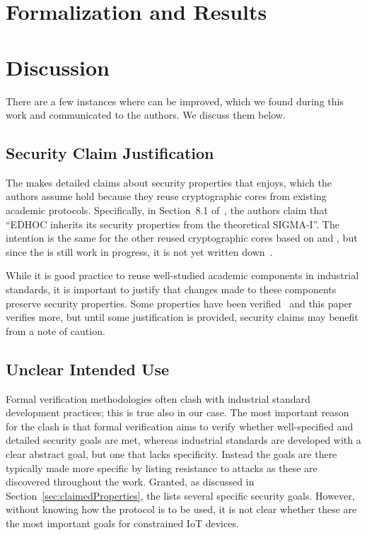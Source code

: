\documentclass[runningheads, envcountsame, hidelinks, a4paper, x11names]{article}
\begin{document}
\section{Formalization and Results}
\label{sec:formalization}


\section{Discussion}
\label{sec:discussion}
There are a few instances where \mEdhoc{} can be improved,
which we found during this work and communicated to the authors. We discuss them below.
%

\subsection{Security Claim Justification}
\label{sec:securityClaims}
The \mSpec{} makes detailed claims about security properties that \mEdhoc{}
enjoys, which the authors assume hold because they reuse cryptographic cores
from existing academic protocols.
%
Specifically, in Section~8.1 of~\cite{selander-lake-edhoc-01}, the authors
claim that ``EDHOC inherits its security properties from the theoretical
\mbox{SIGMA-I}''.
%
The intention is the same for the other reused cryptographic
cores based on \mOptls{} and \mNoise{}, but since the \mSpec{} is still work in
progress, it is not yet written down~\cite{personalCommunication}.
%

While it is good practice to reuse well-studied academic components in
industrial standards, it is important to justify that changes made to these
components preserve security properties.
%
Some properties have been verified~\cite{DBLP:conf/secsr/BruniJPS18} and this paper verifies more, but until some justification is provided, security
claims may benefit from a note of caution.

\subsection{Unclear Intended Use}
\label{sec:unclearProtocolUse}
Formal verification methodologies often clash with industrial standard
development practices; this is true also in our case.
%
The most important reason for the clash is that formal verification aims to
verify whether well-specified and detailed security goals are met, whereas
industrial standards are developed with a clear abstract goal,
but one that lacks specificity.
%
Instead the goals are there typically made more specific by listing resistance
to attacks as these are discovered throughout the work.
%
Granted, as discussed in Section~\ref{sec:claimedProperties}, the \mSpec{} lists
several specific security goals.
%
However, without knowing how the protocol is to be used,
it is not clear whether these are the most important goals for constrained IoT
devices.
%
\end{document}
